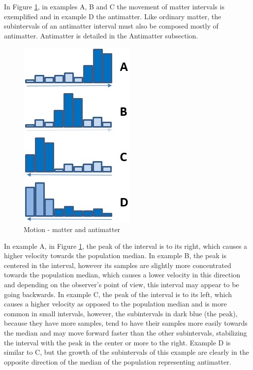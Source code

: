In Figure \ref{fig:consciousness_space_matter_antimatter}, in examples A, B and C the movement of matter intervals is exemplified and in example D the antimatter. Like ordinary matter, the subintervals of an antimatter interval must also be composed mostly of antimatter. Antimatter is detailed in the Antimatter subsection.
	\begin{figure}[H]
	\caption{Motion - matter and antimatter}
	\label{fig:consciousness_space_matter_antimatter}
	\centering
	\includegraphics[scale=.7]{sections/images/consciousness_space_matter_antimatter.jpg}
	\end{figure}

In example A, in Figure \ref{fig:consciousness_space_matter_antimatter}, the peak of the interval is to its right, which causes a higher velocity towards the population median. In example B, the peak is centered in the interval, however its samples are slightly more concentrated towards the population median, which causes a lower velocity in this direction and depending on the observer's point of view, this interval may appear to be going backwards. In example C, the peak of the interval is to its left, which causes a higher velocity as opposed to the population median and is more common in small intervals, however, the subintervals in dark blue (the peak), because they have more samples, tend to have their samples more easily towards the median and may move forward faster than the other subintervals, stabilizing the interval with the peak in the center or more to the right. Example D is similar to C, but the growth of the subintervals of this example are clearly in the opposite direction of the median of the population representing antimatter.

